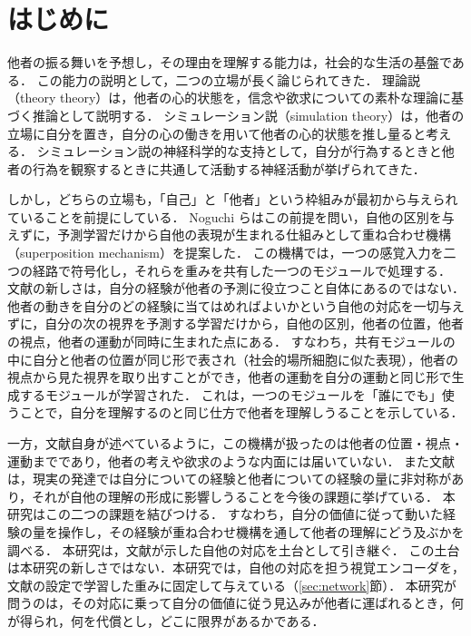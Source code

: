 \section{はじめに}\label{sec:intro}

他者の振る舞いを予想し，その理由を理解する能力は，社会的な生活の基盤である．
この能力の説明として，二つの立場が長く論じられてきた．
理論説（theory theory）は，他者の心的状態を，信念や欲求についての素朴な理論に基づく推論として説明する\cite{gopnik1994theory}．
シミュレーション説（simulation theory）は，他者の立場に自分を置き，自分の心の働きを用いて他者の心的状態を推し量ると考える\cite{gordon1986folk,goldman2006simulating}．
シミュレーション説の神経科学的な支持として，自分が行為するときと他者の行為を観察するときに共通して活動する神経活動が挙げられてきた\cite{gallese1998mirror,rizzolatti2004mirror}．

しかし，どちらの立場も，「自己」と「他者」という枠組みが最初から与えられていることを前提にしている．
Noguchi ら\cite{noguchi2022superposition}はこの前提を問い，自他の区別を与えずに，予測学習だけから自他の表現が生まれる仕組みとして重ね合わせ機構（superposition mechanism）を提案した．
この機構では，一つの感覚入力を二つの経路で符号化し，それらを重みを共有した一つのモジュールで処理する．
文献\cite{noguchi2022superposition}の新しさは，自分の経験が他者の予測に役立つこと自体にあるのではない．
他者の動きを自分のどの経験に当てはめればよいかという自他の対応を一切与えずに，自分の次の視界を予測する学習だけから，自他の区別，他者の位置，他者の視点，他者の運動が同時に生まれた点にある．
すなわち，共有モジュールの中に自分と他者の位置が同じ形で表され（社会的場所細胞\cite{danjo2018spatial,omer2018social}に似た表現），他者の視点から見た視界を取り出すことができ，他者の運動を自分の運動と同じ形で生成するモジュールが学習された．
これは，一つのモジュールを「誰にでも」使うことで，自分を理解するのと同じ仕方で他者を理解しうることを示している．

一方，文献\cite{noguchi2022superposition}自身が述べているように，この機構が扱ったのは他者の位置・視点・運動までであり，他者の考えや欲求のような内面には届いていない．
また文献\cite{noguchi2022superposition}は，現実の発達では自分についての経験と他者についての経験の量に非対称があり，それが自他の理解の形成に影響しうることを今後の課題に挙げている．
本研究はこの二つの課題を結びつける．
すなわち，自分の価値に従って動いた経験の量を操作し，その経験が重ね合わせ機構を通して他者の理解にどう及ぶかを調べる．
本研究は，文献\cite{noguchi2022superposition}が示した自他の対応を土台として引き継ぐ．
この土台は本研究の新しさではない．本研究では，自他の対応を担う視覚エンコーダを，文献\cite{noguchi2022superposition}の設定で学習した重みに固定して与えている（\ref{sec:network}節）．
本研究が問うのは，その対応に乗って自分の価値に従う見込みが他者に運ばれるとき，何が得られ，何を代償とし，どこに限界があるかである．

